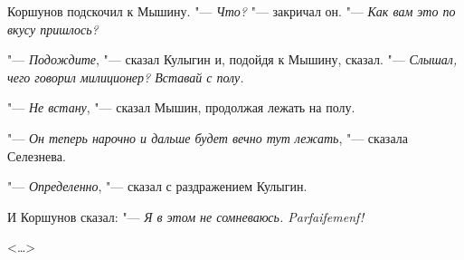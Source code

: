 Коршунов подскочил к Мышину.
"--- \textit{Что?}  "--- закричал  он. "--- \textit{Как вам это по
вкусу пришлось?}

"--- \textit{Подождите}, "--- сказал Кулыгин и, подойдя
к Мышину, сказал. "--- \textit{Слышал, чего говорил милиционер? Вставай с полу.}

"--- \textit{Не встану},  "---  сказал Мышин, продолжая
лежать на полу.

"--- \textit{Он теперь нарочно и дальше будет вечно
тут лежать}, "--- сказала Селезнева.

"--- \textit{Определенно}, "--- сказал  с  раздражением
Кулыгин.

И Коршунов сказал:
"--- \textit{Я в этом не сомневаюсь. Parfaifemenf!}

\begin{flushright}
<\dots>
\end{flushright}
